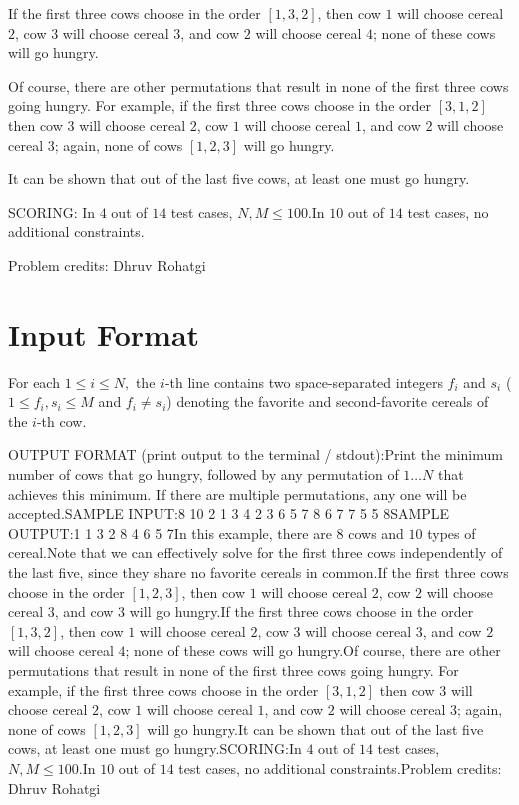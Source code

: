 \documentclass[12pt]{article}
\begin{document}
If the first three cows choose in the order $[1,3,2]$, then cow $1$ will choose
cereal $2$, cow $3$ will choose cereal $3$, and cow $2$ will choose cereal $4$;
none of these cows will go hungry.

Of course, there are other permutations that result in none of the first three
cows going hungry. For example, if the first three cows choose in the order
$[3,1,2]$ then cow $3$ will choose cereal $2$, cow $1$ will choose cereal $1$,
and cow $2$ will choose cereal $3$; again, none of cows $[1,2,3]$ will go
hungry.

It can be shown that out of the last five cows, at least one must go hungry.

SCORING:
In $4$ out of $14$ test cases, $N,M\le 100$.In $10$ out of $14$ test cases, no additional constraints.


Problem credits: Dhruv Rohatgi



\section*{Input Format}
For each $1\le i\le N,$ the $i$-th line contains two space-separated integers
$f_i$ and $s_i$ ($1\le f_i,s_i\le M$ and $f_i\neq s_i$) denoting the favorite
and second-favorite cereals of the $i$-th cow.

OUTPUT FORMAT (print output to the terminal / stdout):Print the minimum number of cows that go hungry, followed by any permutation of
$1\ldots N$ that achieves this minimum. If there are multiple permutations, any
one will be accepted.SAMPLE INPUT:8 10
2 1
3 4
2 3
6 5
7 8
6 7
7 5
5 8SAMPLE OUTPUT:1
1
3
2
8
4
6
5
7In this example, there are $8$ cows and $10$ types of cereal.Note that we can effectively solve for the first three cows independently of 
the last five, since they share no favorite cereals in common.If the first three cows choose in the order $[1,2,3]$, then cow $1$ will choose
cereal $2$, cow $2$ will choose cereal $3$, and cow $3$ will go hungry.If the first three cows choose in the order $[1,3,2]$, then cow $1$ will choose
cereal $2$, cow $3$ will choose cereal $3$, and cow $2$ will choose cereal $4$;
none of these cows will go hungry.Of course, there are other permutations that result in none of the first three
cows going hungry. For example, if the first three cows choose in the order
$[3,1,2]$ then cow $3$ will choose cereal $2$, cow $1$ will choose cereal $1$,
and cow $2$ will choose cereal $3$; again, none of cows $[1,2,3]$ will go
hungry.It can be shown that out of the last five cows, at least one must go hungry.SCORING:In $4$ out of $14$ test cases, $N,M\le 100$.In $10$ out of $14$ test cases, no additional constraints.Problem credits: Dhruv Rohatgi
\end{document}
